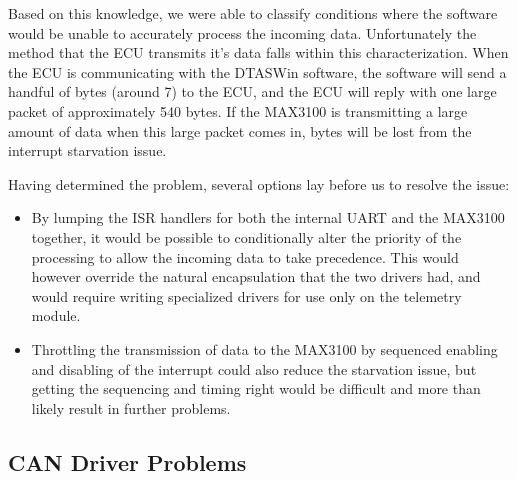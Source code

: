 Based on this knowledge, we were able to classify conditions where the software would be unable to accurately process the incoming data. Unfortunately the method that the ECU transmits it's data falls within this characterization. When the ECU is communicating with the DTASWin software, the software will send a handful of bytes (around 7) to the ECU, and the ECU will reply with one large packet of approximately 540 bytes. If the MAX3100 is transmitting a large amount of data when this large packet comes in, bytes will be lost from the interrupt starvation issue.

Having determined the problem, several options lay before us to resolve the issue:
\begin{itemize}
  \item By lumping the ISR handlers for both the internal UART and the MAX3100 together, it would be possible to conditionally alter the priority of the processing to allow the incoming data to take precedence. This would however override the natural encapsulation that the two drivers had, and would require writing specialized drivers for use only on the telemetry module.
  \item Throttling the transmission of data to the MAX3100 by sequenced enabling and disabling of the interrupt could also reduce the starvation issue, but getting the sequencing and timing right would be difficult and more than likely result in further problems.
\end{itemize}


\subsection{CAN Driver Problems}